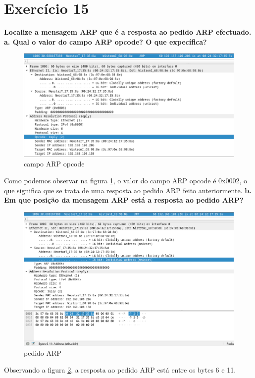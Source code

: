 \documentclass[a4paper]{report}
\begin{document}
\section{Exercício 15}
\textbf{Localize a mensagem ARP que é a resposta ao pedido ARP efectuado.}
\textbf{a. Qual o valor do campo ARP opcode? O que expecífica?}
\begin{figure}[H]
    \centering 
    \includegraphics[width=\textwidth]{images/ex15a.png}
    \caption{campo ARP opcode}
    \label{fig:ex15a}
\end{figure}
Como podemos observar na figura \ref{fig:ex15a}, o valor do campo ARP opcode é
0x0002, o que significa que se trata de uma resposta ao pedido ARP feito
anteriormente.
\textbf{b. Em que posição da mensagem ARP está a resposta ao pedido ARP?}

\begin{figure}[H]
    \centering 
    \includegraphics[width=\textwidth]{images/ex15b.png}
    \caption{pedido ARP}
    \label{fig:ex15b}
\end{figure}
Observando a figura \ref{fig:ex15b}, a resposta ao pedido ARP está entre os
bytes 6 e 11.
\end{document}
